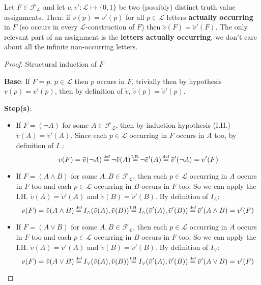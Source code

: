 	\label{lem:AOcc}
	\begin{lemma} Let $F \in \mathcal{F}_\mathcal{L}$ and let $v,v' : \mathcal{L} \mapsto \{0,1\}$ be two (possibly) distinct truth value assignments. Then: if $v(p) = v'(p)$ for all $p \in \mathcal{L}$ letters \textbf{actually occurring} in $F$ (so occurs in every $\mathcal{L}$-construction of $F$) then $\tilde{v}(F) = \tilde{v}'(F)$. The only relevant part of an assignment is the \textbf{letters actually occurring}, we don't care about all the infinite non-occurring letters.
	\end{lemma}
	\begin{proof}
	  Structural induction of $F$

	  \textbf{Base}: If $F=p$, $p \in \mathcal{L}$ then $p$ occurs in $F$, trivially then by hypothesis $v(p) = v'(p)$, then by definition of $\tilde{v}$, $\tilde{v} (p) = \tilde{v}'(p)$. \smallvspace

	  \textbf{Step(s)}:
	  \begin{itemize}
		\item If $F = (\neg A)$ for some $A \in \mathcal{F}_\mathcal{L}$, then by induction hypothesis (I.H.) $\tilde{v} (A) = \tilde{v}'(A)$. Since each $p \in \mathcal{L}$ occurring in $F$ occurs in $A$ too, by definition of $I_\neg$: $$ v(F) = \tilde{v} (\neg A) \stackrel{\mathclap{\tiny\mbox{def}}}{=} \neg \tilde{v}(A) \stackrel{\mathclap{\tiny\mbox{I.H.}}}{=} \neg \tilde{v}'(A) \stackrel{\mathclap{\tiny\mbox{def}}}{=} \tilde{v}' (\neg A) = v'(F)$$

		\item If $F = (A \wedge B)$ for some $A, B \in \mathcal{F}_\mathcal{L}$, then each $p \in \mathcal{L}$ occurring in $A$ occurs in $F$ too and each $p \in \mathcal{L}$ occurring in $B$ occurs in $F$ too.
		So we can apply the I.H. $\tilde{v} (A) = \tilde{v}' (A)$ and $\tilde{v} (B) = \tilde{v}' (B)$. By definition of $I_\wedge$:
			  $$ v(F) = \tilde{v} (A \wedge B) \stackrel{\mathclap{\tiny\mbox{def}}}{=} I_\wedge (\tilde{v}(A), \tilde{v}(B)) \stackrel{\mathclap{\tiny\mbox{I.H.}}}{=}  I_\wedge (\tilde{v}' (A), \tilde{v}' (B)) \stackrel{\mathclap{\tiny\mbox{def}}}{=} \tilde{v}' (A \wedge B) = v'(F) $$

		\item If $F = (A \vee B)$ for some $A, B \in \mathcal{F}_\mathcal{L}$, then each $p \in \mathcal{L}$ occurring in $A$ occurs in $F$ too and each $p \in \mathcal{L}$ occurring in $B$ occurs in $F$ too.
		So we can apply the I.H. $\tilde{v} (A) = \tilde{v}' (A)$ and $\tilde{v} (B) = \tilde{v}' (B)$. By definition of $I_\vee$:
			  $$ v(F) = \tilde{v} (A \vee B) \stackrel{\mathclap{\tiny\mbox{def}}}{=} I_\vee (\tilde{v}(A), \tilde{v}(B)) \stackrel{\mathclap{\tiny\mbox{I.H.}}}{=}  I_\vee (\tilde{v}' (A), \tilde{v}' (B)) \stackrel{\mathclap{\tiny\mbox{def}}}{=} \tilde{v}' (A \vee B) = v'(F) $$


\end{itemize}
\end{proof}

